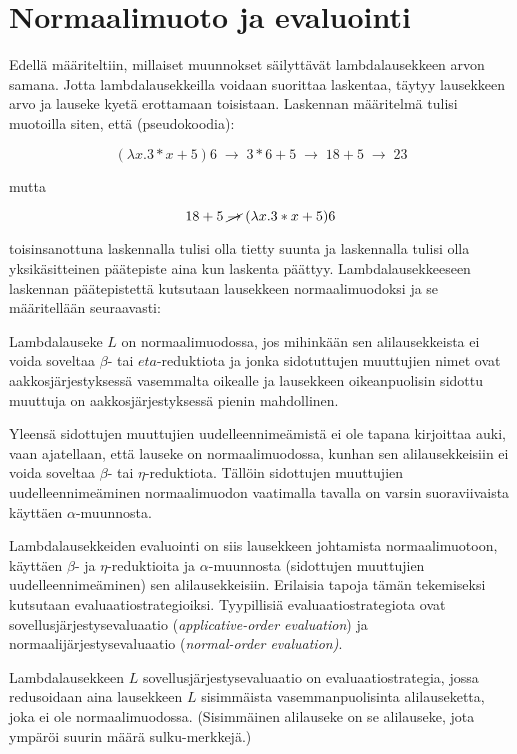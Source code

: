 \section{Normaalimuoto ja evaluointi}

Edellä määriteltiin, millaiset muunnokset säilyttävät lambdalausekkeen arvon samana. Jotta lambdalausekkeilla voidaan suorittaa laskentaa, täytyy lausekkeen arvo ja lauseke kyetä erottamaan toisistaan. Laskennan määritelmä tulisi muotoilla siten, että (pseudokoodia):

\[ 
(\lambda x. 3 * x + 5) 6 \; \rightarrow \; 3 * 6 + 5 \; \rightarrow \; 18 + 5 \; \rightarrow \; 23 
\]

mutta 

\[ 18 + 5 \; \cancel{\rightarrow} \; (\lambda x. 3 * x + 5) 6 \]

toisinsanottuna laskennalla tulisi olla tietty suunta ja laskennalla tulisi olla yksikäsitteinen päätepiste aina kun laskenta päättyy. Lambdalausekkeeseen laskennan päätepistettä kutsutaan lausekkeen normaalimuodoksi ja se määritellään seuraavasti: 

\begin{maar}[normaalimuoto]
Lambdalauseke $L$ on normaalimuodossa, jos mihinkään sen alilausekkeista ei voida soveltaa $\beta$- tai $eta$-reduktiota ja jonka sidotuttujen muuttujien nimet ovat aakkosjärjestyksessä vasemmalta oikealle ja lausekkeen oikeanpuolisin sidottu muuttuja on aakkosjärjestyksessä pienin mahdollinen.  
\end{maar}

Yleensä sidottujen muuttujien uudelleennimeämistä ei ole tapana kirjoittaa auki, vaan ajatellaan, että lauseke on normaalimuodossa, kunhan sen alilausekkeisiin ei voida soveltaa $\beta$- tai $\eta$-reduktiota. Tällöin sidottujen muuttujien uudelleennimeäminen normaalimuodon vaatimalla tavalla on varsin suoraviivaista käyttäen $\alpha$-muunnosta.

\par

Lambdalausekkeiden evaluointi on siis lausekkeen johtamista normaalimuotoon, käyttäen $\beta$- ja $\eta$-reduktioita ja $\alpha$-muunnosta (sidottujen muuttujien uudelleennimeäminen) sen alilausekkeisiin. Erilaisia tapoja tämän tekemiseksi kutsutaan evaluaatiostrategioiksi. Tyypillisiä evaluaatiostrategiota ovat sovellusjärjestysevaluaatio (\textit{applicative-order evaluation}) ja normaalijärjestysevaluaatio (\textit{normal-order evaluation)}.

\begin{alg}[sovellusjärjestysevaluaatio] 
Lambdalausekkeen $L$ sovellusjärjestysevaluaatio on evaluaatiostrategia, jossa redusoidaan aina lausekkeen $L$ sisimmäista vasemmanpuolisinta alilauseketta, joka ei ole normaalimuodossa. (Sisimmäinen alilauseke on se alilauseke, jota ympäröi suurin määrä sulku-merkkejä.)
\end{alg}


